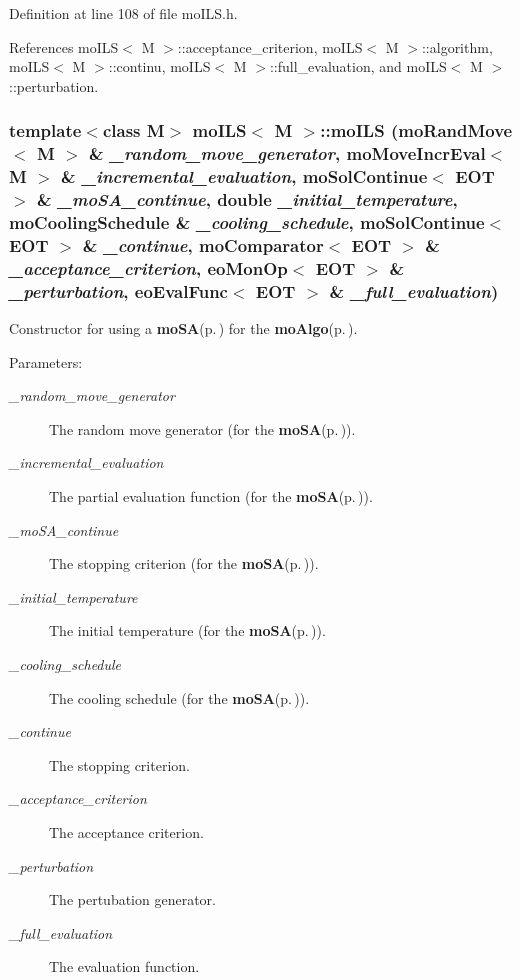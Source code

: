 Definition at line 108 of file mo\-ILS.h.

References mo\-ILS$<$ M $>$::acceptance\_\-criterion, mo\-ILS$<$ M $>$::algorithm, mo\-ILS$<$ M $>$::continu, mo\-ILS$<$ M $>$::full\_\-evaluation, and mo\-ILS$<$ M $>$::perturbation.
\subsubsection{\setlength{\rightskip}{0pt plus 5cm}template$<$class M$>$ {\bf mo\-ILS}$<$ M $>$::{\bf mo\-ILS} ({\bf mo\-Rand\-Move}$<$ M $>$ \& {\em \_\-random\_\-move\_\-generator}, {\bf mo\-Move\-Incr\-Eval}$<$ M $>$ \& {\em \_\-incremental\_\-evaluation}, {\bf mo\-Sol\-Continue}$<$ {\bf EOT} $>$ \& {\em \_\-mo\-SA\_\-continue}, double {\em \_\-initial\_\-temperature}, {\bf mo\-Cooling\-Schedule} \& {\em \_\-cooling\_\-schedule}, {\bf mo\-Sol\-Continue}$<$ {\bf EOT} $>$ \& {\em \_\-continue}, {\bf mo\-Comparator}$<$ {\bf EOT} $>$ \& {\em \_\-acceptance\_\-criterion}, {\bf eo\-Mon\-Op}$<$ {\bf EOT} $>$ \& {\em \_\-perturbation}, {\bf eo\-Eval\-Func}$<$ {\bf EOT} $>$ \& {\em \_\-full\_\-evaluation})\hspace{0.3cm}{\tt  [inline]}}\label{classmo_i_l_s_a3}


Constructor for using a {\bf mo\-SA}{\rm (p.\,\pageref{classmo_s_a})} for the {\bf mo\-Algo}{\rm (p.\,\pageref{classmo_algo})}. 

\begin{Desc}
\item[Parameters:]
\begin{description}
\item[{\em \_\-random\_\-move\_\-generator}]The random move generator (for the {\bf mo\-SA}{\rm (p.\,\pageref{classmo_s_a})}). \item[{\em \_\-incremental\_\-evaluation}]The partial evaluation function (for the {\bf mo\-SA}{\rm (p.\,\pageref{classmo_s_a})}). \item[{\em \_\-mo\-SA\_\-continue}]The stopping criterion (for the {\bf mo\-SA}{\rm (p.\,\pageref{classmo_s_a})}). \item[{\em \_\-initial\_\-temperature}]The initial temperature (for the {\bf mo\-SA}{\rm (p.\,\pageref{classmo_s_a})}). \item[{\em \_\-cooling\_\-schedule}]The cooling schedule (for the {\bf mo\-SA}{\rm (p.\,\pageref{classmo_s_a})}). \item[{\em \_\-continue}]The stopping criterion. \item[{\em \_\-acceptance\_\-criterion}]The acceptance criterion. \item[{\em \_\-perturbation}]The pertubation generator. \item[{\em \_\-full\_\-evaluation}]The evaluation function. \end{description}
\end{Desc}


